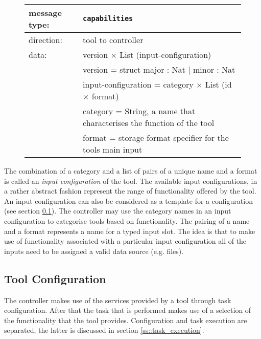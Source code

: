 \documentclass{article}
\newcommand{\msg}[1]{\texttt{#1}}
\begin{document}
   \begin{figure}[H]
    \begin{center}
     \begin{tabular}{|ll|}
      \hline
       message type:   & \msg{capabilities} \\
      \hline
       direction:      & tool to controller \\
       data:           & version $\times$ List (input-configuration) \\
                       &  version             = struct major : Nat $|$ minor : Nat \\
                       &  input-configuration = category $\times$ List (id $\times$ format) \\
                       &  category            = String,   a name that characterises the function of the tool \\
                       &  format              = storage format specifier for the tools main input \\
      \hline
     \end{tabular}
    \end{center}
   \end{figure}

   \noindent The combination of a category and a list of pairs of a unique name and a
   format is called an \textit{input configuration} of the tool.  The available
   input configurations, in a rather abstract fashion represent the range of
   functionality offered by the tool.  An input configuration can also be
   considered as a template for a configuration (see section
   \ref{ss::tool_configuration}). The controller may use the category names
   in an input configuration to categorise tools based on functionality. The
   pairing of a name and a format represents a name for a typed input slot. The
   idea is that to make use of functionality associated with a particular input
   configuration all of the inputs need to be assigned a valid data source
   (e.g. files).

  \subsection{Tool Configuration} \label{ss::tool_configuration}

   The controller makes use of the services provided by a tool through task
   configuration. After that the task that is performed makes use of a
   selection of the functionality that the tool provides.  Configuration and
   task execution are separated, the latter is discussed in section
   \ref{ss::task_execution}.
\end{document}
